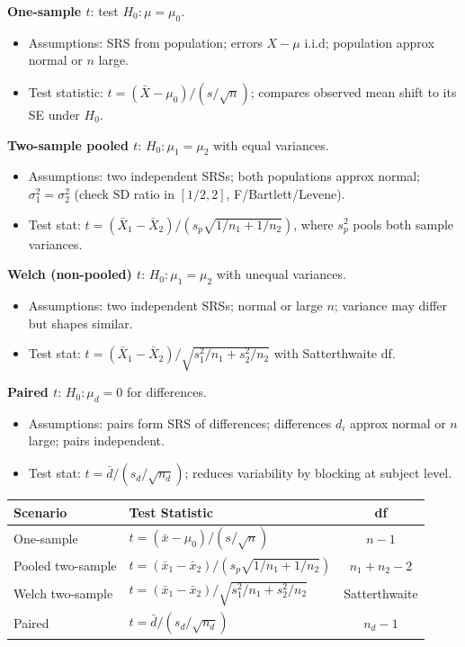 \documentclass[9pt,letterpaper]{article}
\begin{document}
\textbf{One-sample $t$}: test $H_0:\mu=\mu_0$.
\begin{itemize}
    \item Assumptions: SRS from population; errors $X-\mu$ i.i.d; population approx normal or $n$ large.
    \item Test statistic: $t=(\bar{X}-\mu_0)/(s/\sqrt{n})$; compares observed mean shift to its SE under $H_0$.
\end{itemize}

\textbf{Two-sample pooled $t$}: $H_0:\mu_1=\mu_2$ with equal variances.
\begin{itemize}
    \item Assumptions: two independent SRSs; both populations approx normal; $\sigma_1^2=\sigma_2^2$ (check SD ratio in $[1/2,2]$, F/Bartlett/Levene).
    \item Test stat: $t=(\bar{X}_1-\bar{X}_2)/(s_p\sqrt{1/n_1+1/n_2})$, where $s_p^2$ pools both sample variances.
\end{itemize}

\textbf{Welch (non-pooled) $t$}: $H_0:\mu_1=\mu_2$ with unequal variances.
\begin{itemize}
    \item Assumptions: two independent SRSs; normal or large $n$; variance may differ but shapes similar.
    \item Test stat: $t=(\bar{X}_1-\bar{X}_2)/\sqrt{s_1^2/n_1+s_2^2/n_2}$ with Satterthwaite df.
\end{itemize}

\textbf{Paired $t$}: $H_0:\mu_d=0$ for differences.
\begin{itemize}
    \item Assumptions: pairs form SRS of differences; differences $d_i$ approx normal or $n$ large; pairs independent.
    \item Test stat: $t=\bar{d}/(s_d/\sqrt{n_d})$; reduces variability by blocking at subject level.
\end{itemize}

\begin{center}\small
\begin{tabular}{@{}llc@{}}
\toprule
Scenario & Test Statistic & df \\
\midrule
One-sample & $t=(\bar{x}-\mu_0)/(s/\sqrt{n})$ & $n-1$ \\
Pooled two-sample & $t=(\bar{x}_1-\bar{x}_2)/(s_p\sqrt{1/n_1+1/n_2})$ & $n_1+n_2-2$ \\
Welch two-sample & $t=(\bar{x}_1-\bar{x}_2)/\sqrt{s_1^2/n_1+s_2^2/n_2}$ & Satterthwaite \\
Paired & $t=\bar{d}/(s_d/\sqrt{n_d})$ & $n_d-1$ \\
\bottomrule
\end{tabular}
\end{center}
\end{document}
